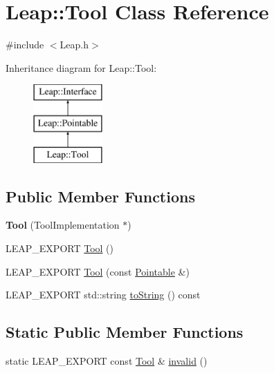 \hypertarget{class_leap_1_1_tool}{\section{Leap\+:\+:Tool Class Reference}
\label{class_leap_1_1_tool}
}


{\ttfamily \#include $<$Leap.\+h$>$}

Inheritance diagram for Leap\+:\+:Tool\+:\begin{figure}[H]
\begin{center}
\leavevmode
\includegraphics[height=3.000000cm]{class_leap_1_1_tool}
\end{center}
\end{figure}
\subsection*{Public Member Functions}
\begin{DoxyCompactItemize}
\item 
\hypertarget{class_leap_1_1_tool_a856522513b4dbf3ef4e2a9a9667f5735}{{\bfseries Tool} (Tool\+Implementation $\ast$)}\label{class_leap_1_1_tool_a856522513b4dbf3ef4e2a9a9667f5735}

\item 
L\+E\+A\+P\+\_\+\+E\+X\+P\+O\+R\+T \hyperlink{class_leap_1_1_tool_a6debbdfc14096362bf32228ba3e5c72f}{Tool} ()
\item 
L\+E\+A\+P\+\_\+\+E\+X\+P\+O\+R\+T \hyperlink{class_leap_1_1_tool_a6dfea4c318389bcc6d1ef373d7a4432e}{Tool} (const \hyperlink{class_leap_1_1_pointable}{Pointable} \&)
\item 
L\+E\+A\+P\+\_\+\+E\+X\+P\+O\+R\+T std\+::string \hyperlink{class_leap_1_1_tool_ad3dbe186886683f46996fd0c8ca5a940}{to\+String} () const 
\end{DoxyCompactItemize}
\subsection*{Static Public Member Functions}
\begin{DoxyCompactItemize}
\item 
static L\+E\+A\+P\+\_\+\+E\+X\+P\+O\+R\+T const \hyperlink{class_leap_1_1_tool}{Tool} \& \hyperlink{class_leap_1_1_tool_af47b7fe3674536f265470e7ab3467ef1}{invalid} ()
\end{DoxyCompactItemize}
